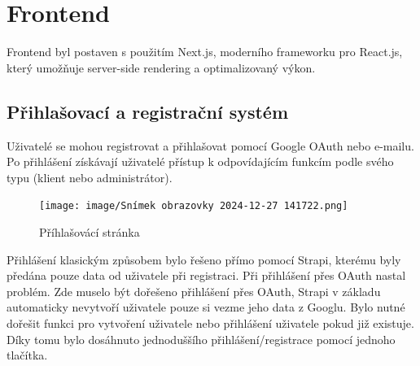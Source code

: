 \documentclass[12pt, a4paper,
openright
]{report}
\begin{document}
\clearpage
    \section{Frontend} 
    Frontend byl postaven s použitím Next.js, moderního frameworku pro React.js, který umožňuje server-side rendering a optimalizovaný výkon.
    
\subsection{Přihlašovací a registrační systém}
Uživatelé se mohou registrovat a přihlašovat pomocí Google OAuth nebo e-mailu.
Po přihlášení získávají uživatelé přístup k odpovídajícím funkcím podle svého typu (klient nebo administrátor).
\begin{figure}[h]
    \centering
    \texttt{[image: image/Snímek obrazovky 2024-12-27 141722.png]}
    \caption{Příhlašovácí stránka}
    \label{fig:enter-label}
\end{figure}

Přihlášení klasickým způsobem bylo řešeno přímo pomocí Strapi, kterému byly předána pouze data od uživatele při registraci. Při přihlášení přes OAuth nastal problém.
Zde muselo být dořešeno přihlášení přes OAuth, Strapi v základu automaticky nevytvoří uživatele pouze si vezme jeho data z Googlu. Bylo nutné dořešit funkci pro vytvoření uživatele nebo přihlášení uživatele pokud již existuje. Díky tomu bylo dosáhnuto jednoduššího přihlášení/registrace pomocí jednoho tlačítka.
\end{document}
